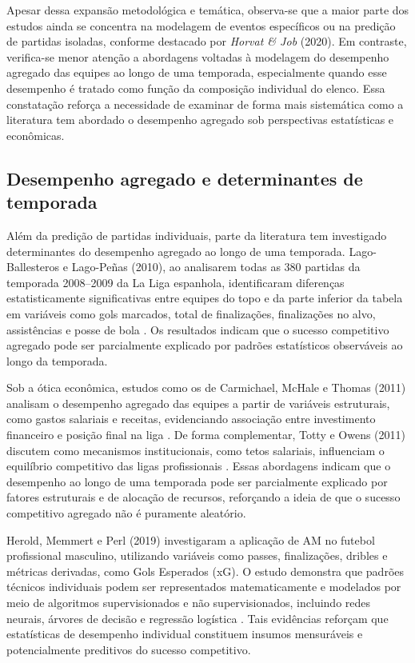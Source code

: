 Apesar dessa expansão metodológica e temática, observa-se que a maior parte dos estudos ainda se concentra na modelagem de eventos específicos ou na predição de partidas isoladas, 
conforme destacado por \textit{Horvat \& Job} (2020). Em contraste, verifica-se menor atenção a abordagens voltadas à modelagem do desempenho agregado das equipes ao longo de 
uma temporada, especialmente quando esse desempenho é tratado como função da composição individual do elenco. 
Essa constatação reforça a necessidade de examinar de forma mais sistemática como a literatura tem abordado o desempenho agregado sob perspectivas estatísticas e econômicas.

\subsection{Desempenho agregado e determinantes de temporada}

Além da predição de partidas individuais, parte da literatura tem investigado determinantes do desempenho agregado ao longo de uma temporada. 
Lago-Ballesteros e Lago-Peñas (2010), ao analisarem todas as 380 partidas da temporada 2008--2009 da La Liga espanhola, identificaram 
diferenças estatisticamente significativas entre equipes do topo e da parte inferior da tabela em variáveis como gols marcados, total de finalizações, 
finalizações no alvo, assistências e posse de bola \cite{LagoBallesteros2010}. Os resultados indicam que o sucesso competitivo agregado pode ser parcialmente 
explicado por padrões estatísticos observáveis ao longo da temporada.

Sob a ótica econômica, estudos como os de Carmichael, McHale e Thomas (2011) analisam o desempenho agregado das equipes a partir de variáveis estruturais, 
como gastos salariais e receitas, evidenciando associação entre investimento financeiro e posição final na liga \cite{Carmichael2011}. De forma complementar, 
Totty e Owens (2011) discutem como mecanismos institucionais, como tetos salariais, influenciam o equilíbrio competitivo das ligas profissionais \cite{TottyOwens2011}. 
Essas abordagens indicam que o desempenho ao longo de uma temporada pode ser parcialmente explicado por fatores estruturais e de alocação de recursos, reforçando 
a ideia de que o sucesso competitivo agregado não é puramente aleatório.

Herold, Memmert e Perl (2019) investigaram a aplicação de AM no futebol profissional masculino, utilizando variáveis como passes, finalizações, dribles e métricas derivadas,
como Gols Esperados (xG). O estudo demonstra que padrões técnicos individuais podem ser representados matematicamente e modelados por meio de algoritmos supervisionados 
e não supervisionados, incluindo redes neurais, árvores de decisão e regressão logística \cite{Herold2019}. Tais evidências reforçam que estatísticas de desempenho individual 
constituem insumos mensuráveis e potencialmente preditivos do sucesso competitivo.

